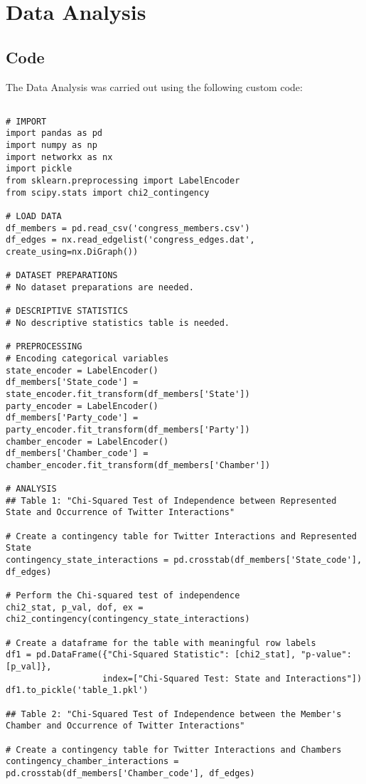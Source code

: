 \documentclass[11pt]{article}
\begin{document}
\section{Data Analysis}
\subsection{{Code}}
The Data Analysis was carried out using the following custom code:

\begin{verbatim}

# IMPORT
import pandas as pd
import numpy as np
import networkx as nx
import pickle
from sklearn.preprocessing import LabelEncoder
from scipy.stats import chi2_contingency

# LOAD DATA
df_members = pd.read_csv('congress_members.csv')
df_edges = nx.read_edgelist('congress_edges.dat', create_using=nx.DiGraph())

# DATASET PREPARATIONS
# No dataset preparations are needed.

# DESCRIPTIVE STATISTICS
# No descriptive statistics table is needed.

# PREPROCESSING
# Encoding categorical variables
state_encoder = LabelEncoder()
df_members['State_code'] = state_encoder.fit_transform(df_members['State'])
party_encoder = LabelEncoder()
df_members['Party_code'] = party_encoder.fit_transform(df_members['Party'])
chamber_encoder = LabelEncoder()
df_members['Chamber_code'] = chamber_encoder.fit_transform(df_members['Chamber'])

# ANALYSIS
## Table 1: "Chi-Squared Test of Independence between Represented State and Occurrence of Twitter Interactions"

# Create a contingency table for Twitter Interactions and Represented State
contingency_state_interactions = pd.crosstab(df_members['State_code'], df_edges)

# Perform the Chi-squared test of independence
chi2_stat, p_val, dof, ex = chi2_contingency(contingency_state_interactions)

# Create a dataframe for the table with meaningful row labels
df1 = pd.DataFrame({"Chi-Squared Statistic": [chi2_stat], "p-value": [p_val]}, 
                   index=["Chi-Squared Test: State and Interactions"])
df1.to_pickle('table_1.pkl')

## Table 2: "Chi-Squared Test of Independence between the Member's Chamber and Occurrence of Twitter Interactions"

# Create a contingency table for Twitter Interactions and Chambers
contingency_chamber_interactions = pd.crosstab(df_members['Chamber_code'], df_edges)


\end{verbatim}
\end{document}

